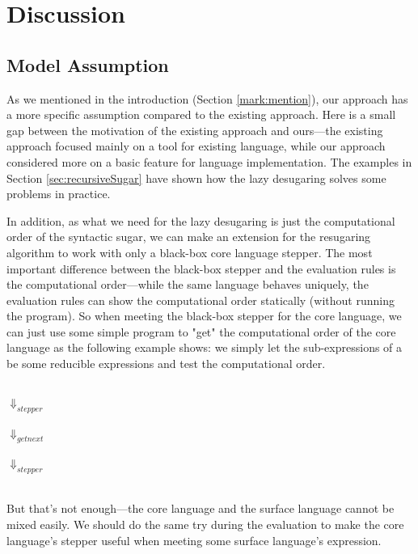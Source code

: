 \section{Discussion}
\label{sec5}

\subsection{Model Assumption}
\label{sec5.1}


As we mentioned in the introduction (Section \ref{mark:mention}), our approach has a more specific assumption compared to the existing approach. Here is a small gap between the motivation of the existing approach and ours---the existing approach focused mainly on a tool for existing language, while our approach considered more on a basic feature for language implementation. The examples in Section \ref{sec:recursiveSugar} have shown how the lazy desugaring solves some problems in practice.

In addition, as what we need for the lazy desugaring is just the computational order of the syntactic sugar, we can make an extension for the resugaring algorithm to work with only a black-box core language stepper. The most important difference between the black-box stepper and the evaluation rules is the computational order---while the same language behaves uniquely, the evaluation rules can show the computational order statically (without running the program). So when meeting the black-box stepper for the core language, we can just use some simple program to "get" the computational order of the core language as the following example  shows: we simply let the sub-expressions of a  be some reducible expressions and test the computational order.

\begin{center}\footnotesize
	\\ $\Downarrow_{stepper}$\\ \\ $\Downarrow_{getnext}$\\ \\ $\Downarrow_{stepper}$\\ \qquad{}\\
\end{center}


But that's not enough---the core language and the surface language cannot be mixed easily. We should do the same try during the evaluation to make the core language's stepper useful when meeting some surface language's expression.

